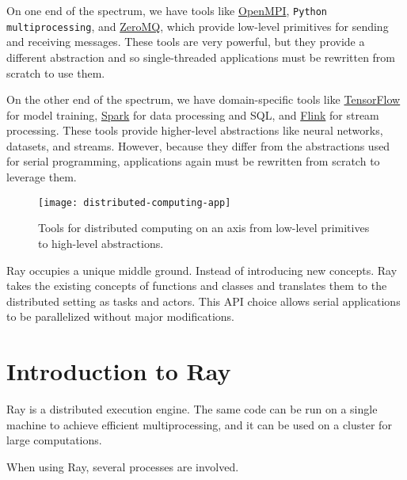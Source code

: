 On one end of the spectrum, we have tools like \href{https://www.open-mpi.org/}{OpenMPI}, \verb|Python multiprocessing|, and \href{http://zeromq.org/}{ZeroMQ}, which provide low-level primitives for sending and receiving messages. These tools are very powerful, but they provide a different abstraction and so single-threaded applications must be rewritten from scratch to use them.

On the other end of the spectrum, we have domain-specific tools like \href{https://www.tensorflow.org/}{TensorFlow} for model training, \href{https://spark.apache.org/}{Spark} for data processing and SQL, and \href{https://flink.apache.org/}{Flink} for stream processing. These tools provide higher-level abstractions like neural networks, datasets, and streams. However, because they differ from the abstractions used for serial programming, applications again must be rewritten from scratch to leverage them.

\begin{figure}[!htbp]
    \centering
    \texttt{[image: distributed-computing-app]}
    \caption{Tools for distributed computing on an axis from low-level primitives to high-level abstractions.}
\end{figure}

Ray occupies a unique middle ground. Instead of introducing new concepts. Ray takes the existing concepts of functions and classes and translates them to the distributed setting as tasks and actors. This API choice allows serial applications to be parallelized without major modifications.

\section{Introduction to Ray}
Ray is a distributed execution engine. The same code can be run on a single machine to achieve efficient multiprocessing, and it can be used on a cluster for large computations.

When using Ray, several processes are involved.

